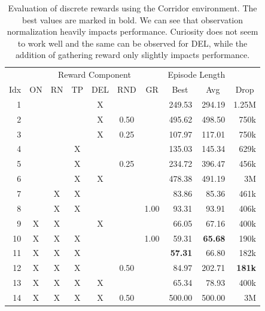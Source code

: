 \begin{table}[ht!]
    \begin{center}
        \begin{tabular}{rccccccrrr}
            \toprule
             & \multicolumn{6}{c}{Reward Component} & \multicolumn{2}{c}{Episode Length} & \\
            \cmidrule(lr){2-7}\cmidrule(lr){8-9}
            \multicolumn{1}{c}{Idx} & \multicolumn{1}{c}{ON} & \multicolumn{1}{c}{RN} & \multicolumn{1}{c}{TP} & \multicolumn{1}{c}{DEL} & \multicolumn{1}{c}{RND} & \multicolumn{1}{c}{GR} & \multicolumn{1}{c}{Best} & \multicolumn{1}{c}{Avg} & \multicolumn{1}{c}{Drop}\\
            \midrule
            1 &  &  &  & X &  &  & 249.53 & 294.19 & 1.25M \\
            2 &  &  &  & X & 0.50 &  & 495.62 & 498.50 & 750k \\
            3 &  &  &  & X & 0.25 &  & 107.97 & 117.01 & 750k \\
            4 &  &  & X &  &  &  & 135.03 & 145.34 & 629k \\
            5 &  &  & X &  & 0.25 &  & 234.72 & 396.47 & 456k \\
            6 &  &  & X & X &  &  & 478.38 & 491.19 & 3M \\
            7 &  & X & X &  &  &  & 83.86 & 85.36 & 461k \\
            8 &  & X & X &  &  & 1.00 & 93.31 & 93.91 & 406k \\
            9 & X & X &  & X &  &  & 66.05 & 67.16 & 400k \\
            10 & X & X & X &  &  & 1.00 & 59.31 & \textbf{65.68} & 190k \\
            11 & X & X & X &  &  &  & \textbf{57.31} & 66.80 & 182k \\
            12 & X & X & X &  & 0.50 &  & 84.97 & 202.71 & \textbf{181k} \\
            13 & X & X & X & X &  &  & 65.34 & 78.93 & 400k \\
            14 & X & X & X & X & 0.50 &  & 500.00 & 500.00 & 3M \\
            \bottomrule
        \end{tabular}
    \end{center}
    \caption[Evaluation of Discrete Rewards using the Corridor Environment]{Evaluation of discrete rewards using the Corridor environment. The best values are marked in bold. We can see that observation normalization heavily impacts performance. Curiosity does not seem to work well and the same can be observed for DEL, while the addition of gathering reward only slightly impacts performance.} \label{tab:Maze0318/Reward/Discrete}
\end{table}

